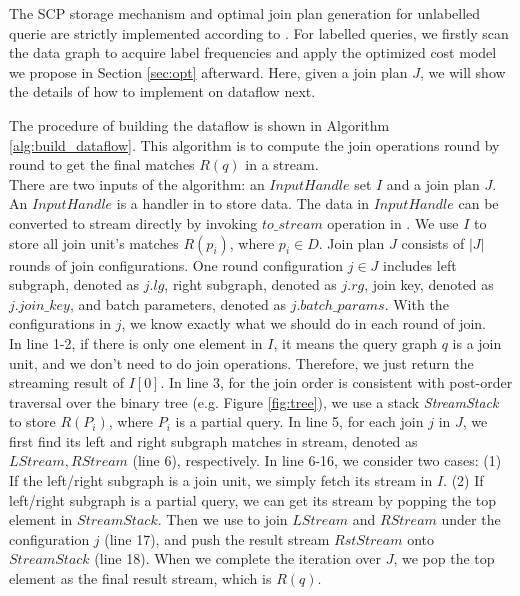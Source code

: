   The SCP storage mechanism and optimal join plan generation for unlabelled querie are strictly implemented according to \cite{Lai2016}. For labelled queries, we firstly scan the data graph to acquire label frequencies and apply the optimized cost model we propose in Section \ref{sec:opt} afterward. Here, given a join plan $J$, we will show the details of how to implement \gencliqjoin on \timely dataflow next. 

 The procedure of building the dataflow is shown in Algorithm \ref{alg:build_dataflow}. This algorithm is to compute the join operations round by round to get the final matches $R(q)$ in a stream.\\

There are two inputs of the algorithm: an $InputHandle$ set $I$ and a join plan $J$. An $InputHandle$ is a handler in \timely to store data. The data in $InputHandle$ can be converted to stream directly by invoking $to\_stream$ operation in \timely. We use $I$ to store all join unit's matches $R(p_i)$, where $p_i \in D$. Join plan $J$ consists of $|J|$ rounds of join configurations. One round configuration $j\in J$ includes left subgraph, denoted as $j.lg$, right subgraph, denoted as $j.rg$, join key, denoted as $j.join\_key$, and batch parameters, denoted as $j.batch\_params$. With the configurations in $j$, we know exactly what we should do in each round of join. \\

In line 1-2, if there is only one element in $I$, it means the query graph $q$ is a join unit, and we don't need to do join operations. Therefore, we just return the streaming result of $I[0]$. In line 3, for the join order is consistent with post-order traversal over the binary tree (e.g. Figure \ref{fig:tree}), we use a stack \textit{StreamStack} to store $R(P_i)$, where $P_i$ is a partial query. In line 5, for each join $j$ in $J$, we first find its left and right subgraph matches in stream, denoted as $LStream, RStream$ (line 6), respectively. In line 6-16, we consider two cases: (1) If the left/right subgraph is a join unit, we simply fetch its stream in $I$. (2) If left/right subgraph is a partial query, we can get its stream by popping the top element in $StreamStack$. Then we use  to join $LStream$ and $RStream$ under the configuration $j$ (line 17), and push the result stream $RstStream$ onto $StreamStack$ (line 18). When we complete the iteration over $J$, we pop the top element as the final result stream, which is $R(q)$.

